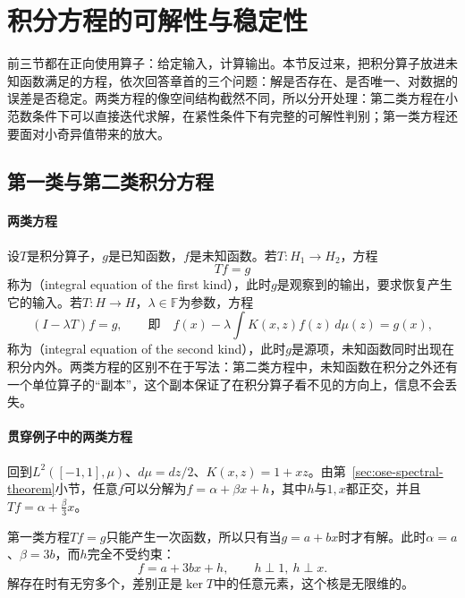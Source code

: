 
\section{积分方程的可解性与稳定性}
\label{sec:ose-integral-equations}

前三节都在正向使用算子：给定输入，计算输出。本节反过来，把积分算子放进未知函数满足的方程，依次回答章首的三个问题：解是否存在、是否唯一、对数据的误差是否稳定。两类方程的像空间结构截然不同，所以分开处理：第二类方程在小范数条件下可以直接迭代求解，在紧性条件下有完整的可解性判别；第一类方程还要面对小奇异值带来的放大。

\subsection{第一类与第二类积分方程}
\label{sec:ose-equation-types}

\paragraph{两类方程}
设$T$是积分算子，$g$是已知函数，$f$是未知函数。若$T:H_1\to H_2$，方程
\begin{equation}
  Tf=g
  \label{eq:ose-first-kind}
\end{equation}
称为（integral equation of the first kind），此时$g$是观察到的输出，要求恢复产生它的输入。若$T:H\to H$，$\lambda\in\mathbb F$为参数，方程
\begin{equation}
  (I-\lambda T)f=g,\qquad\text{即}\quad f(x)-\lambda\int K(x,z)f(z)\,d\mu(z)=g(x),
  \label{eq:ose-second-kind}
\end{equation}
称为（integral equation of the second kind），此时$g$是源项，未知函数同时出现在积分内外。两类方程的区别不在于写法：第二类方程中，未知函数在积分之外还有一个单位算子的“副本”，这个副本保证了在积分算子看不见的方向上，信息不会丢失。

\paragraph{贯穿例子中的两类方程}
回到$L^2([-1,1],\mu)$、$d\mu=dz/2$、$K(x,z)=1+xz$。由第~\ref{sec:ose-spectral-theorem}小节，任意$f$可以分解为$f=\alpha+\beta x+h$，其中$h$与$1,x$都正交，并且$Tf=\alpha+\frac{\beta}{3}x$。

第一类方程$Tf=g$只能产生一次函数，所以只有当$g=a+bx$时才有解。此时$\alpha=a$、$\beta=3b$，而$h$完全不受约束：
\[
  f=a+3bx+h,\qquad h\perp1,\ h\perp x .
\]
解存在时有无穷多个，差别正是$\ker T$中的任意元素，这个核是无限维的。

